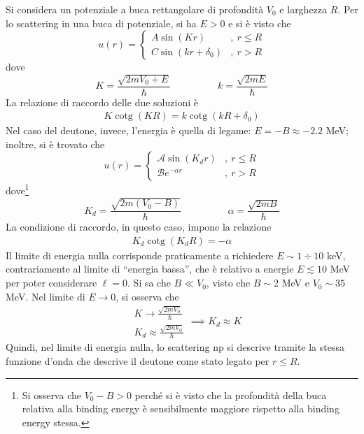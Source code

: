 \documentclass[11pt, a4paper]{scrartcl}
\theoremstyle{style}
\numberwithin{equation}{subsection}
\begin{document}
Si considera un potenziale a buca rettangolare di profondit\`a $V_0$ e larghezza $R$.
Per lo scattering in una buca di potenziale, si ha $E>0$ e si \`e visto che
\[
u(r) = \begin{cases}
	A \sin (Kr) &,\ r\le R\\ 
	C \sin(k r + \delta _0) &,\ r>R
\end{cases}
\] 
dove 
\[
	K = \frac{\sqrt{2mV_0 + E} }{\hbar } \hspace{2cm} k =  \frac{\sqrt{2m E }}{\hbar }
\] 
La relazione di raccordo delle due soluzioni \`e 
\begin{align}
	K \operatorname{cotg} (KR) = k \operatorname{cotg} (kR + \delta _0)\tag{$\dagger $}
\end{align}
Nel caso del deutone, invece, l'energia \`e quella di legame: $E = - B \approx -2.2$ MeV; inoltre, si \`e trovato che
\[
u(r) = \begin{cases}
	\mathcal{A}  \sin ( K_d r )  &,\ r\le R\\
	\mathcal{B} e^{-\alpha r} &,\ r > R
\end{cases}
\] 
dove\footnote{Si osserva che $V_0 - B > 0$ perch\'e si \`e visto che la profondit\`a della buca relativa alla binding energy \`e sensibilmente maggiore rispetto alla binding energy stessa.}
\[
K_d = \frac{\sqrt{2m ( V_0 - B)} }{\hbar } \hspace{2cm} \alpha  = \frac{\sqrt{2 m B} }{\hbar }
\] 
La condizione di raccordo, in questo caso, impone la relazione
\begin{align}
	K_d \operatorname{cotg}  ( K_d R ) = - \alpha \tag{$\blacksquare$}
\end{align}
Il limite di energia nulla corrisponde praticamente a richiedere $E \sim 1\div 10$ keV, contrariamente al limite di ``energia bassa'', che \`e relativo a energie $E\lesssim 10$ MeV per poter considerare $\ell =0$.
Si sa che $B \ll V_0$, visto che $B\sim 2$ MeV e $V_0 \sim 35$ MeV.
Nel limite di $E\to 0$, si osserva che 
\[
\begin{split}
	&K \to \frac{\sqrt{2m V_0} }{\hbar } \\ 
	&K_d \approx \frac{\sqrt{2m V_0} }{\hbar }
\end{split}\implies K_d \approx K
\] 
Quindi, nel limite di energia nulla, lo scattering np si descrive tramite la stessa funzione d'onda che descrive il deutone come stato legato per $r\le R$.
\end{document}
